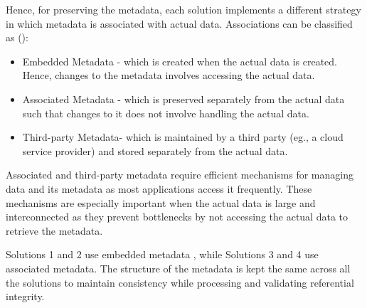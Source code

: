 

Hence,  for preserving the metadata, each 
solution implements a  different strategy in which metadata is associated
with actual data.  Associations can be classified as ():


\begin{itemize}
  \item Embedded Metadata - which is created when the actual data is
  created.  Hence, changes to the metadata involves accessing the actual data.
  
  \item Associated Metadata - which is preserved separately from
  the actual data such that changes to it does not involve handling the
  actual data. 
  \item Third-party Metadata- which is maintained by a third
  party (eg., a cloud service provider) and stored separately 
  from the actual data. 
\end{itemize}
Associated  and third-party metadata require efficient mechanisms for
managing  data and its metadata as most
applications access it  frequently. These mechanisms are especially important  
when the actual data is large and interconnected as they prevent bottlenecks by
not accessing  the actual data to retrieve the metadata. 

 Solutions 1 and 2  use embedded metadata , while Solutions 3 and 4 use associated
metadata.
The structure of the metadata is kept the same across all the solutions to
maintain consistency while processing  and  validating  referential
integrity.

